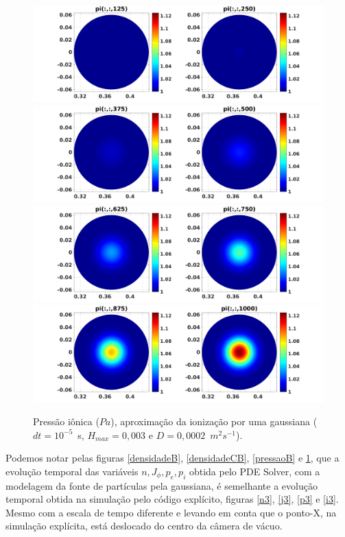 \documentclass[12pt,oneside,a4paper]{abntex2}
\begin{document}
\begin{figure}[H]
\centering
\includegraphics[scale=0.5]{../SImulacao_breakdown/PDE/pitod1B6.png}  
\includegraphics[scale=0.5]{../SImulacao_breakdown/PDE/pitod2B6.png} 
\includegraphics[scale=0.5]{../SImulacao_breakdown/PDE/pitod3B6.png} 
\includegraphics[scale=0.5]{../SImulacao_breakdown/PDE/pitod4B6.png} 
\caption{Pressão iônica ($Pa$), aproximação da ionização por uma gaussiana ($dt=10^{-5}$\ s, $H_{max} = 0,003$ e $D=0,0002$\ $m^2s^{-1}$).}
\label{pressao2B}
\end{figure}
Podemos notar pelas figuras \ref{densidadeB}, \ref{densidadeCB}, \ref{pressaoB} e \ref{pressao2B}, que a evolução temporal das variáveis $n, J_\phi, p_e, p_i$ obtida pelo PDE Solver, com a modelagem da fonte de partículas pela gaussiana, é  semelhante a evolução temporal obtida na simulação pelo código explícito, figuras \ref{n3}, \ref{j3}, \ref{p3} e \ref{i3}. Mesmo com a escala de tempo diferente e levando em conta que o ponto-X, na simulação explícita, está deslocado do centro da câmera de vácuo. 
\end{document}
